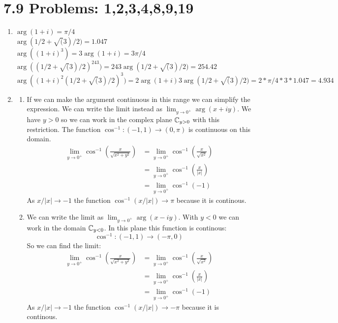 \documentclass{article}
\begin{document}
  \section*{7.9 Problems: 1,2,3,4,8,9,19}
  \begin{enumerate}
    \item
      $\arg(1+i)=\pi/4$\\
      $\arg(1/2+\sqrt(3)/2)=1.047$\\
      $\arg((1+i)^3)=3\arg(1+i)=3\pi/4$\\
      $\arg((1/2+\sqrt(3)/2)^243)=243\arg(1/2+\sqrt(3)/2)=254.42$\\
      $\arg((1+i)^2(1/2+\sqrt(3)/2)^3)=2\arg(1+i)3\arg(1/2+\sqrt(3)/2)=2*\pi/4*3*1.047=4.934$
    \item
      \begin{enumerate}[label=(\roman*)]
        \item
          If we can make the argument continuous in this range we can simplify the expression. We can write the limit instead as $\lim_{y\to0^+}\arg(x+iy)$. We have $y>0$ so we can work in the complex plane $\mathbb{C}_{y>0}$ with this restriction. The function $\cos^{-1}:(-1,1)\to(0,\pi)$ is continuous on this domain.
          \begin{align*}
            \lim_{y\to0^+}\cos^{-1}\left(\frac{x}{\sqrt{x^2+y^2}}\right)&=\lim_{y\to0^+}\cos^{-1}\left(\frac{x}{\sqrt{x^2}}\right)\\
            &=\lim_{y\to0^+}\cos^{-1}\left(\frac{x}{|x|}\right)\\
            &=\lim_{y\to0^+}\cos^{-1}(-1)
          \end{align*}
          As $x/|x|\to-1$ the function $\cos^{-1}(x/|x|)\to\pi$ because it is continous.
        \item
          We can write the limit as $\lim_{y\to0^+}\arg(x-iy)$. With $y<0$ we can work in the domain $\mathbb{C}_{y<0}$. In this plane this function is continous:
          \[\cos^{-1}:(-1,1)\to(-\pi,0)\]
          So we can find the limit:
          \begin{align*}
            \lim_{y\to0^+}\cos^{-1}\left(\frac{x}{\sqrt{x^2+y^2}}\right)&=\lim_{y\to0^+}\cos^{-1}\left(\frac{x}{\sqrt{x^2}}\right)\\
            &=\lim_{y\to0^+}\cos^{-1}\left(\frac{x}{|x|}\right)\\
            &=\lim_{y\to0^+}\cos^{-1}(-1)
          \end{align*}
          As $x/|x|\to-1$ the function $\cos^{-1}(x/|x|)\to-\pi$ because it is continous.

\end{enumerate}
\end{enumerate}
\end{document}
